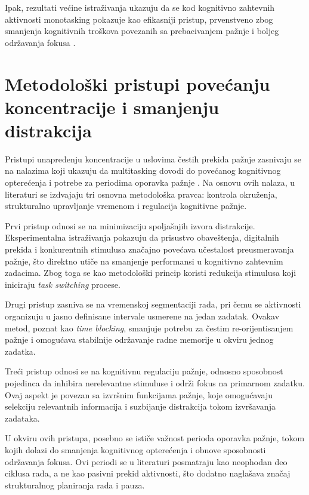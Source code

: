 \documentclass[12pt,a4paper]{article}
\begin{document}
Ipak, rezultati većine istraživanja ukazuju da se kod kognitivno zahtevnih aktivnosti monotasking pokazuje kao efikasniji pristup, prvenstveno zbog smanjenja kognitivnih troškova povezanih sa prebacivanjem pažnje i boljeg održavanja fokusa \cite{ophir2009, rubinstein2001}.


\section{Metodološki pristupi povećanju koncentracije i smanjenju distrakcija}

Pristupi unapređenju koncentracije u uslovima čestih prekida pažnje zasnivaju se na nalazima koji ukazuju da multitasking dovodi do povećanog kognitivnog opterećenja i potrebe za periodima oporavka pažnje \cite{schumann2022}. Na osnovu ovih nalaza, u literaturi se izdvajaju tri osnovna metodološka pravca: kontrola okruženja, strukturalno upravljanje vremenom i regulacija kognitivne pažnje.

Prvi pristup odnosi se na minimizaciju spoljašnjih izvora distrakcije. Eksperimentalna istraživanja pokazuju da prisustvo obaveštenja, digitalnih prekida i konkurentnih stimulusa značajno povećava učestalost preusmeravanja pažnje, što direktno utiče na smanjenje performansi u kognitivno zahtevnim zadacima. Zbog toga se kao metodološki princip koristi redukcija stimulusa koji iniciraju \textit{task switching} procese.

Drugi pristup zasniva se na vremenskoj segmentaciji rada, pri čemu se aktivnosti organizuju u jasno definisane intervale usmerene na jedan zadatak. Ovakav metod, poznat kao \textit{time blocking}, smanjuje potrebu za čestim re-orijentisanjem pažnje i omogućava stabilnije održavanje radne memorije u okviru jednog zadatka.

Treći pristup odnosi se na kognitivnu regulaciju pažnje, odnosno sposobnost pojedinca da inhibira nerelevantne stimuluse i održi fokus na primarnom zadatku. Ovaj aspekt je povezan sa izvršnim funkcijama pažnje, koje omogućavaju selekciju relevantnih informacija i suzbijanje distrakcija tokom izvršavanja zadataka.

U okviru ovih pristupa, posebno se ističe važnost perioda oporavka pažnje, tokom kojih dolazi do smanjenja kognitivnog opterećenja i obnove sposobnosti održavanja fokusa. Ovi periodi se u literaturi posmatraju kao neophodan deo ciklusa rada, a ne kao pasivni prekid aktivnosti, što dodatno naglašava značaj strukturalnog planiranja rada i pauza.
\end{document}

